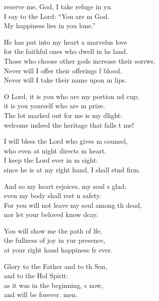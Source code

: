 \settowidth{\versewidth}{Those who choose other gods increase their sorrows. +}
\begin{psalmverse}%
  \begin{patverse}
reserve me, God, I take refuge in yu.\Flex\\
I say to the Lord: “You are m God.\Med\\
My happiness lies in you lone.”

He has put into my heart a marvelus love\Med\\
for the faithful ones who dwell in h\pointup{\i}s land.\\
Those who choose other gods increase their sorrws.\Flex\\
Never will I offer their offerings f blood.\Med\\
Never will I take their name upon m lips.

O Lord, it is you who are my portion nd cup;\Med\\
it is you yourself who are m prize.\\
The lot marked out for me is my dlight:\Med\\
welcome indeed the heritage that falls t me!

I will bless the Lord who gives m counsel,\Med\\
who even at night directs m heart.\\
I keep the Lord ever in m sight:\Med\\
since he is at my right hand, I shall stnd firm.

And so my heart rejoices, my soul \pointup{\i}s glad;\Med\\
even my body shall rest \pointup{\i}n safety.\\
For you will not leave my soul among th dead,\Med\\
nor let your beloved know dcay.

You will show me the path of l\pointup{\i}fe,\Flex\\
the fullness of joy in yur presence,\Med\\
at your right hand happiness fr ever.

Glory to the Father and to th Son,\Med\\
and to the Hol Spirit:\\
as it was in the beginning, \pointup{\i}s now,\Med\\
and will be forever. men. 
  \end{patverse}
\end{psalmverse}
